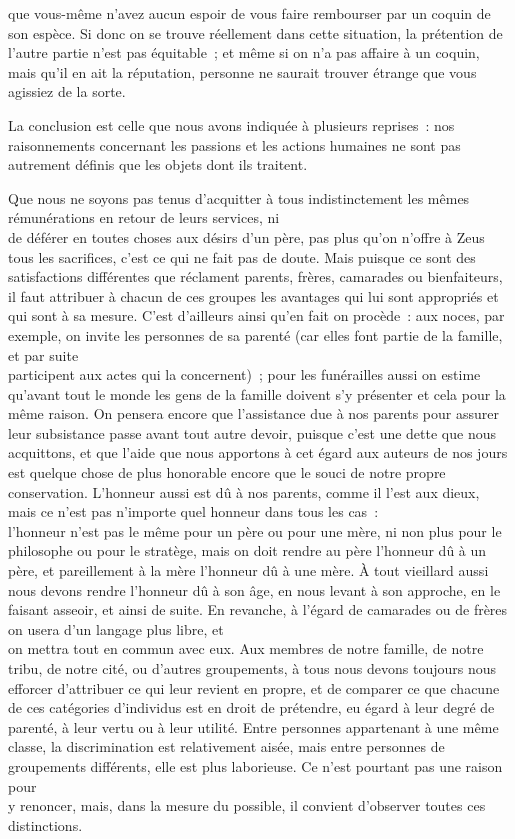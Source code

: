 \documentclass[french,twoside]{book} %
\begin{document}
que vous-même n’avez aucun espoir de vous faire rembourser par un coquin de son espèce. Si donc on se trouve réellement dans cette situation, la prétention de l’autre partie n’est pas équitable ; et même si on n’a pas affaire à un coquin, mais qu’il en ait la réputation, personne ne saurait trouver étrange que vous agissiez de la sorte.\par
La conclusion est celle que nous avons indiquée à plusieurs reprises : nos raisonnements concernant les passions et les actions humaines ne sont pas autrement définis que les objets dont ils traitent.\par
Que nous ne soyons pas tenus d’acquitter à tous indistinctement les mêmes rémunérations en retour de leurs services, ni \\
de déférer en toutes choses aux désirs d’un père, pas plus qu’on n’offre à Zeus tous les sacrifices, c’est ce qui ne fait pas de doute. Mais puisque ce sont des satisfactions différentes que réclament parents, frères, camarades ou bienfaiteurs, il faut attribuer à chacun de ces groupes les avantages qui lui sont appropriés et qui sont à sa mesure. C’est d’ailleurs ainsi qu’en fait on procède : aux noces, par exemple, on invite les personnes de sa parenté (car elles font partie de la famille, et par suite \\
participent aux actes qui la concernent) ; pour les funérailles aussi on estime qu’avant tout le monde les gens de la famille doivent s’y présenter et cela pour la même raison. On pensera encore que l’assistance due à nos parents pour assurer leur subsistance passe avant tout autre devoir, puisque c’est une dette que nous acquittons, et que l’aide que nous apportons à cet égard aux auteurs de nos jours est quelque chose de plus honorable encore que le souci de notre propre conservation. L’honneur aussi est dû à nos parents, comme il l’est aux dieux, mais ce n’est pas n’importe quel honneur dans tous les cas : \\
l’honneur n’est pas le même pour un père ou pour une mère, ni non plus pour le philosophe ou pour le stratège, mais on doit rendre au père l’honneur dû à un père, et pareillement à la mère l’honneur dû à une mère. À tout vieillard aussi nous devons rendre l’honneur dû à son âge, en nous levant à son approche, en le faisant asseoir, et ainsi de suite. En revanche, à l’égard de camarades ou de frères on usera d’un langage plus libre, et \\
on mettra tout en commun avec eux. Aux membres de notre famille, de notre tribu, de notre cité, ou d’autres groupements, à tous nous devons toujours nous efforcer d’attribuer ce qui leur revient en propre, et de comparer ce que chacune de ces catégories d’individus est en droit de prétendre, eu égard à leur degré de parenté, à leur vertu ou à leur utilité. Entre personnes appartenant à une même classe, la discrimination est relativement aisée, mais entre personnes de groupements différents, elle est plus laborieuse. Ce n’est pourtant pas une raison pour \\
y renoncer, mais, dans la mesure du possible, il convient d’observer toutes ces distinctions.
\end{document}
